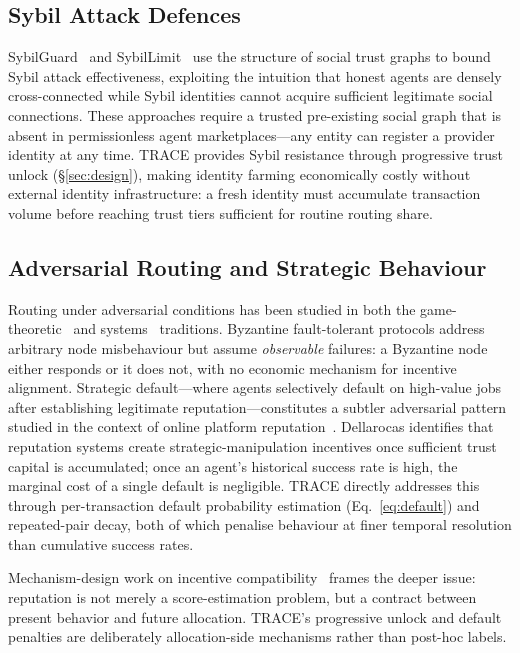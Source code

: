\documentclass[sigconf,nonacm,10pt]{acmart}
\begin{document}
\subsection{Sybil Attack Defences}

SybilGuard~\cite{yu2006sybilguard} and
SybilLimit~\cite{yu2008sybillimit} use the structure of social
trust graphs to bound Sybil attack effectiveness, exploiting the
intuition that honest agents are densely cross-connected while
Sybil identities cannot acquire sufficient legitimate social
connections. These approaches require a trusted pre-existing
social graph that is absent in permissionless agent
marketplaces---any entity can register a provider identity at any
time. TRACE provides Sybil resistance through progressive trust
unlock (\S\ref{sec:design}), making identity farming economically
costly without external identity infrastructure: a fresh identity
must accumulate transaction volume before reaching trust tiers
sufficient for routine routing share.

\subsection{Adversarial Routing and Strategic Behaviour}

Routing under adversarial conditions has been studied in both the
game-theoretic~\cite{nisan2007algorithmic} and
systems~\cite{malkhi1997byzantine} traditions. Byzantine
fault-tolerant protocols address arbitrary node misbehaviour but
assume \emph{observable} failures: a Byzantine node either
responds or it does not, with no economic mechanism for incentive
alignment. Strategic default---where agents selectively default on
high-value jobs after establishing legitimate
reputation---constitutes a subtler adversarial pattern studied in
the context of online platform
reputation~\cite{dellarocas2003digitization}. Dellarocas identifies
that reputation systems create strategic-manipulation incentives
once sufficient trust capital is accumulated; once an agent's
historical success rate is high, the marginal cost of a single
default is negligible. TRACE directly addresses this through
per-transaction default probability estimation
(Eq.~\ref{eq:default}) and repeated-pair decay, both of which
penalise behaviour at finer temporal resolution than cumulative
success rates.

Mechanism-design work on incentive compatibility~\cite{myerson1979ic}
frames the deeper issue: reputation is not merely a score-estimation
problem, but a contract between present behavior and future allocation.
TRACE's progressive unlock and default penalties are deliberately
allocation-side mechanisms rather than post-hoc labels.
\end{document}
